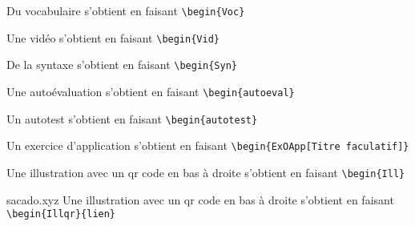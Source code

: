 \documentclass[a4paper,dvipsnames]{article}
\begin{document}
\begin{Voc}
Du vocabulaire s'obtient en faisant \verb|\begin{Voc}|
\end{Voc}

\begin{Vid}
Une vidéo s'obtient en faisant \verb|\begin{Vid}|
\end{Vid}

\begin{Syn}
De la syntaxe s'obtient en faisant \verb|\begin{Syn}|
\end{Syn}

\begin{autoeval}
Une autoévaluation s'obtient en faisant \verb|\begin{autoeval}|
\end{autoeval}

\begin{autotest}
Un autotest s'obtient en faisant \verb|\begin{autotest}|
\end{autotest}

\begin{ExOApp}[]
Un exercice d'application s'obtient en faisant \verb|\begin{ExOApp[Titre faculatif]}|
\end{ExOApp}

\begin{Ill}
Une illustration avec un qr code en bas à droite s'obtient en faisant \verb|\begin{Ill}|
\end{Ill}

\begin{Illqr}{sacado.xyz}
Une illustration avec un qr code en bas à droite s'obtient en faisant \verb|\begin{Illqr}{lien}|
\end{Illqr}
\end{document}
